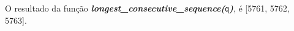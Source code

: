 \documentclass[12pt,varwidth=16cm,border=1pt]{standalone}
\begin{document}
O resultado da função \textbf{\textit{longest\_consecutive\_sequence(}}\verb+q+\textbf{\textit{)}}, é [5761, 5762, 5763].

\questiomfalse
\end{document}
